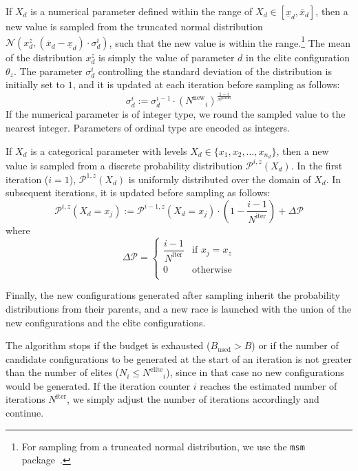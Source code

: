 \documentclass[a4paper]{article}
\newcommand{\assign}{\ensuremath{:=}}
\newcommand{\iter}{\ensuremath{i}\xspace}
\newcommand{\Budget}{\ensuremath{B}\xspace}
\newcommand{\Bused}{\ensuremath{\Budget_\text{used}}\xspace}
\newcommand{\Ncand}[1][]{\ensuremath{N_{#1}}\xspace}
\newcommand{\Nparam}{\ensuremath{{N^\text{param}}}\xspace}
\newcommand{\Niter}{\ensuremath{N^\text{iter}}\xspace}
\newcommand{\Nelite}{\ensuremath{N^\text{elite}}\xspace}
\newcommand{\Nnew}{\ensuremath{N^\text{new}}\xspace}
\begin{document}
If $X_d$ is a numerical parameter defined within the range of $X_d \in
[\underline{x}_d, \overline{x}_d]$, then a new value is sampled from
the truncated normal distribution $\mathcal{N}(x_d^z, (\overline{x}_d - \underline{x}_d)\cdot\sigma_d^i)$,
such that the new value is within the range.\footnote{%
  For sampling from a truncated normal distribution, we use the
  \texttt{msm} package~\cite{Jac2011jss}.} The mean of the
distribution $x_d^z$ is simply the value of parameter $d$ in the elite
configuration $\theta_z$. The parameter $\sigma_d^i$ controlling the standard deviation of the distribution is initially set to $1$, and it is updated at each iteration before sampling as follows:
%
\begin{equation}\label{eq:sigma}
  \sigma_d^i \assign  \sigma_d^{i-1} \cdot {(\Nnew_i)}^{\frac{1-i}{\Nparam}}
\end{equation}
%
If the numerical parameter is of integer type, we round the sampled
value to the nearest integer. Parameters of ordinal type are
encoded as integers.

If $X_d$ is a categorical parameter with levels $X_d \in \{x_1, x_2,
\dotsc, x_{n_d} \}$, then a new value is sampled from a discrete
probability distribution $\mathcal{P}^{\iter,z}(X_d)$. In the first iteration ($\iter = 1$), $\mathcal{P}^{1,z}(X_d)$ is uniformly distributed over
the domain of $X_d$. In subsequent iterations, it is updated before
sampling as follows:
%
\begin{equation}\label{eq:prob_update}
  \mathcal{P}^{\iter,z} (X_d = x_j) \assign \mathcal{P}^{\iter-1,z} (X_d = x_j)
  \cdot \left(1 - \frac{\iter-1}{\Niter}\right) + \Delta \mathcal{P}
\end{equation}
where 
\begin{equation}\label{eq:2}
  \Delta \mathcal{P} = 
  \begin{cases}
    \dfrac{\iter - 1}{\Niter} & \text{if $x_j = x_z$}\\
    0  & \text{otherwise}\\
  \end{cases}
\end{equation}
%

Finally, the new configurations generated after sampling inherit the
probability distributions from their parents, and a new race is
launched with the union of the new configurations and the elite
configurations.

The algorithm stops if the budget is exhausted ($\Bused > \Budget$) or
if the number of candidate configurations to be generated at the start
of an iteration is not greater than the number of elites ($\Ncand[\iter]
\leq \Nelite_i$), since in that case no new configurations would be
generated. If the iteration counter $\iter$ reaches the estimated
number of iterations $\Niter$, we simply adjust the number of
iterations accordingly and continue.
\end{document}
